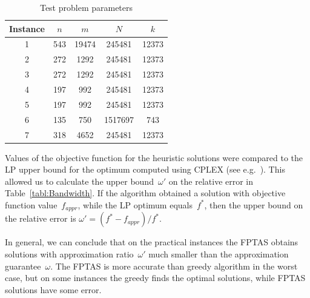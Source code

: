 \documentclass{ifacconf}
\begin{document}
\begin{table}
\caption{Test problem parameters} \label{tabl:Problems}
 \centering
\begin{tabular}{|c|c|c|c|c|}
\hline
 { Instance }    &$n$& $m$ & $N$  & $k$\\
\hline
1&543&19474&245481& 12373 \\
2 &272&1292 &245481& 12373 \\
3&272&1292 &245481& 12373\\
4&197& 992 &245481& 12373\\
5&197& 992 &245481& 12373\\
6&135& 750 &1517697& 743 \\
7&318&4652& 245481& 12373\\
  \hline
\end{tabular}
\end{table}

Values of the objective function for the heuristic solutions were compared to the LP upper bound for the
optimum computed using CPLEX (see e.g.~\cite{BEHTV19}). This allowed us to calculate the upper bound~$\omega'$ on the 
relative error in Table~\ref{tabl:Bandwidth}. If the algorithm obtained a 
solution with objective function value~$f_{appr}$, while the LP optimum
equals~$f^*$, then the upper bound on the relative error is $\omega'=(f^*-f_{appr})/f^*$. 

In general, we can conclude that on the practical instances the FPTAS obtains solutions with approximation ratio~$\omega'$ much smaller than the approximation guarantee~$\omega$. The FPTAS is more accurate than greedy algorithm in the worst case, but on some instances the greedy finds the optimal solutions, while FPTAS solutions have some error. 
\end{document}
